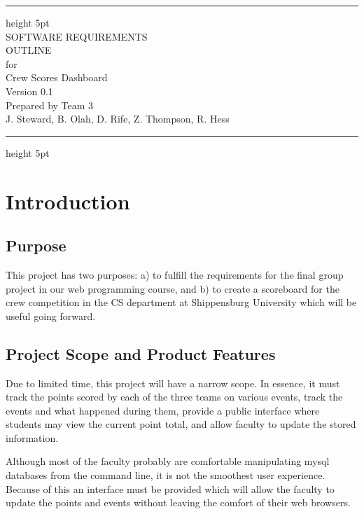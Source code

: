 \documentclass{scrreprt}
\def\myversion{0.1 }
\def\hrulefill{\leavevmode\leaders\hrule height 5pt\hfill\kern\z}
\begin{document}
\begin{titlepage}
\ocrfamily
\flushright
\hrulefill\\
\vspace*{\fill}
\Huge{SOFTWARE REQUIREMENTS\\ OUTLINE}\\
\vspace{2cm}
for\\
\vspace{2cm}
Crew Scores Dashboard\\
\vspace{2cm}
\vspace{2cm}
\LARGE{Version \myversion\\}
\vspace{2cm}
Prepared by Team 3\\
{\small J. Steward, B. Olah, D. Rife, Z. Thompson, R. Hess}\\
\vfill
\hrulefill
\end{titlepage}

\date{}

\tableofcontents
\chapter{Introduction}
    \section{Purpose}
    
This project has two purposes: a) to fulfill the requirements for the final group project in our web programming course, and b) to create a scoreboard for the crew competition in the CS department at Shippensburg University which will be useful going forward.
    
    \section{Project Scope and Product Features}

Due to limited time, this project will have a narrow scope. In essence, it must track the points scored by each of the three teams on various events, track the events and what happened during them, provide a public interface where students may view the current point total, and allow faculty to update the stored information. 

Although most of the faculty probably are comfortable manipulating mysql databases from the command line, it is not the smoothest user experience. Because of this an interface must be provided which will allow the faculty to update the points and events without leaving the comfort of their web browsers.
\end{document}
